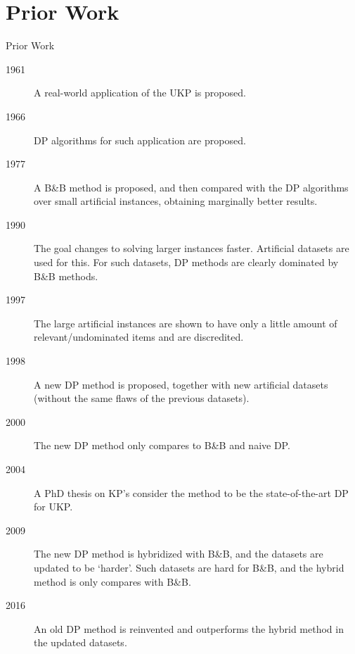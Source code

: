 \documentclass{beamer}
\newcommand{\currentsection}{}
\newcommand{\mysection}[1]{\renewcommand{\currentsection}{#1}\section{#1}}
\begin{document}
\mysection{Prior Work}
\begin{frame}[allowframebreaks]{Prior Work}
\begin{description}
\item[1961] A real-world application of the UKP is proposed.\cite{gg-61} %
\item[1966] DP algorithms for such application are proposed.\cite{gg-66} %
\item[1977] A B\&B method is proposed, and then compared with the DP algorithms over small artificial instances, obtaining marginally better results.\cite{mtu1} %
\item[1990] The goal changes to solving larger instances faster. Artificial datasets are used for this. For such datasets, DP methods are clearly dominated by B\&B methods.\cite{mtu2} %
\item[1997] The large artificial instances are shown to have only a little amount of relevant/undominated items and are discredited.\cite{zhu_dominated} %
\item[1998] A new DP method is proposed, together with new artificial datasets (without the same flaws of the previous datasets).\cite{ukp_new_results} %
\item[2000] The new DP method only compares to B\&B and naive DP.\cite{eduk} %
\item[2004] A PhD thesis on KP's consider the method to be the state-of-the-art DP for UKP.\cite{book_ukp_2004}
\item[2009] The new DP method is hybridized with B\&B, and the datasets are updated to be `harder'. Such datasets are hard for B\&B, and the hybrid method is only compares with B\&B.\cite{pya} %
\item[2016] An old DP method is reinvented and outperforms the hybrid method in the updated datasets.\cite{sea2016}
\end{description}
\end{frame}

\end{document}

